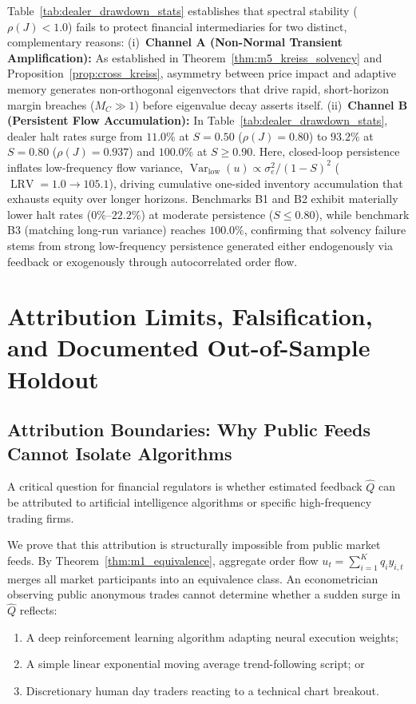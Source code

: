 \documentclass[12pt]{article}
\theoremstyle{definition}
\theoremstyle{remark}
\begin{document}
Table~\ref{tab:dealer_drawdown_stats} establishes that spectral stability ($\rho(J) < 1.0$) fails to protect financial intermediaries for two distinct, complementary reasons:
(i)~\textbf{Channel A (Non-Normal Transient Amplification):} As established in Theorem~\ref{thm:m5_kreiss_solvency} and Proposition~\ref{prop:cross_kreiss}, asymmetry between price impact and adaptive memory generates non-orthogonal eigenvectors that drive rapid, short-horizon margin breaches ($M_C \gg 1$) before eigenvalue decay asserts itself.
(ii)~\textbf{Channel B (Persistent Flow Accumulation):} In Table~\ref{tab:dealer_drawdown_stats}, dealer halt rates surge from $11.0\%$ at $S=0.50$ ($\rho(J) = 0.80$) to $93.2\%$ at $S=0.80$ ($\rho(J) = 0.937$) and $100.0\%$ at $S \ge 0.90$. Here, closed-loop persistence inflates low-frequency flow variance, $\operatorname{Var}_{\text{low}}(u) \propto \sigma_e^2 / (1 - S)^2$ ($\operatorname{LRV} = 1.0 \to 105.1$), driving cumulative one-sided inventory accumulation that exhausts equity over longer horizons. Benchmarks B1 and B2 exhibit materially lower halt rates ($0\%$--$22.2\%$) at moderate persistence ($S \le 0.80$), while benchmark B3 (matching long-run variance) reaches $100.0\%$, confirming that solvency failure stems from strong low-frequency persistence generated either endogenously via feedback or exogenously through autocorrelated order flow.

\section{Attribution Limits, Falsification, and Documented Out-of-Sample Holdout}
\label{sec:attribution_falsification}

\subsection{Attribution Boundaries: Why Public Feeds Cannot Isolate Algorithms}
A critical question for financial regulators is whether estimated feedback $\hat{Q}$ can be attributed to artificial intelligence algorithms or specific high-frequency trading firms.

We prove that this attribution is structurally impossible from public market feeds. By Theorem~\ref{thm:m1_equivalence}, aggregate order flow $u_t = \sum_{i=1}^K q_i y_{i,t}$ merges all market participants into an equivalence class. An econometrician observing public anonymous trades cannot determine whether a sudden surge in $\hat{Q}$ reflects:
\begin{enumerate}[noitemsep,topsep=1pt]
    \item A deep reinforcement learning algorithm adapting neural execution weights;
    \item A simple linear exponential moving average trend-following script; or
    \item Discretionary human day traders reacting to a technical chart breakout.
\end{enumerate}
\end{document}
